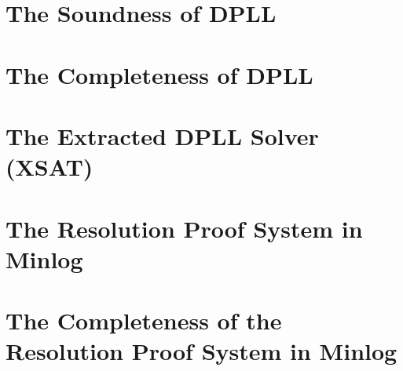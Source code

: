 \section{The Soundness of DPLL}

\section{The Completeness of DPLL}

\section{The Extracted DPLL Solver (XSAT)}

\section{The Resolution Proof System in Minlog}

\section{The Completeness of the Resolution Proof System in Minlog}